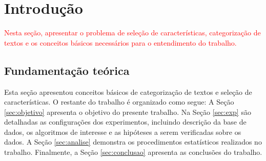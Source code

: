 \documentclass[conference]{IEEEtran}
\begin{document}

\section{Introdução}
\label{sec:intro}

\textcolor{red}{Nesta seção, apresentar o problema de seleção de características, categorização de textos e os conceitos básicos necessários para o entendimento do trabalho.}

\subsection{Fundamentação teórica}

Esta seção apresentou conceitos básicos de categorização de textos e seleção de características. 
O restante do trabalho é organizado como segue: 
A Seção \ref{sec:objetivo} apresenta o objetivo do presente trabalho. 
Na Seção \ref{sec:exp} são detalhadas as configurações dos experimentos, incluindo descrição da base de dados, os algoritmos de interesse e as hipóteses a serem verificadas sobre os dados. 
A Seção \ref{sec:analise} demonstra os procedimentos estatísticos realizados no trabalho.
Finalmente, a Seção \ref{sec:conclusao} apresenta as conclusões do trabalho.
\end{document}
